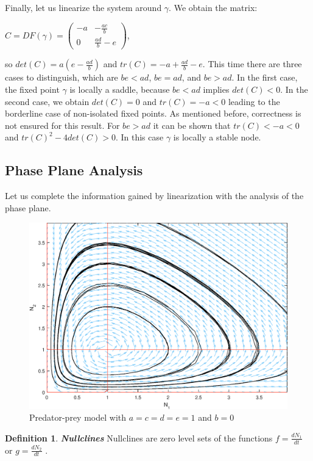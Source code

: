 \documentclass[11pt,a4paper]{scrartcl}
\theoremstyle{definition}
\newtheorem*{definition}{Definition}
\begin{document}
Finally, let us linearize the system around $\gamma$. We obtain the matrix:

\begin{center}
$C=DF(\gamma)=\begin{pmatrix}
	-a & -\frac{ac}{b} \\
	0 & \frac{ad}{b}-e
\end{pmatrix}$,
\end{center}

so $det(C)=a(e-\frac{ad}{b})$ and $tr(C)=-a+\frac{ad}{b}-e$. This time there are three cases to distinguish, which are $be<ad$, $be=ad$, and $be>ad$. In the first case, the fixed point $\gamma$ is locally a saddle, because $be<ad$ implies $det(C)<0$. In the second case, we obtain $det(C)=0$ and $tr(C)=-a<0$ leading to the borderline case of non-isolated fixed points. As mentioned before, correctness is not ensured for this result. For $be>ad$ it can be shown that $tr(C)<-a<0$ and $tr(C)^2-4det(C)>0$. In this case $\gamma$ is locally a stable node.

\subsection{Phase Plane Analysis}
Let us complete the information gained by linearization with the analysis of the phase plane. 

\begin{figure}[h]
	\centering
	\includegraphics[scale=0.72]{nCenter.eps}
	\caption{Predator-prey model with $a=c=d=e=1$ and $b=0$}
	\label{Center}
\end{figure}
\FloatBarrier

\begin{definition}{\textbf{\textit{Nullclines}}}
\newline
Nullclines are zero level sets of the functions $f=\frac{dN_1}{dt}$ or $g=\frac{dN_2}{dt}$ \cite{main}.
\end{definition}
\end{document}
